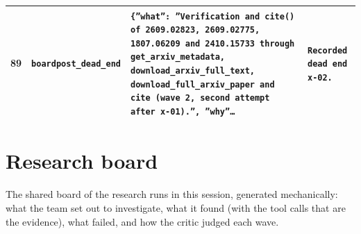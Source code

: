 \documentclass[11pt,a4paper]{article}
\begin{document}
\begin{longtable}{@{}p{}p{}p{}p{}@{}}
89 & \texttt{board}\newline\texttt{post\_\allowbreak{}dead\_\allowbreak{}end} & \texttt{\{''what'':\allowbreak{} ''Verification and cite()\allowbreak{} of 2609.02823,\allowbreak{} 2609.02775,\allowbreak{} 1807.06209 and 2410.15733 through get\_\allowbreak{}arxiv\_\allowbreak{}metadata,\allowbreak{} download\_\allowbreak{}arxiv\_\allowbreak{}full\_\allowbreak{}text,\allowbreak{} download\_\allowbreak{}full\_\allowbreak{}arxiv\_\allowbreak{}paper and cite (wave 2,\allowbreak{} second attempt after x-01)\allowbreak{}.'',\allowbreak{} ''why''\ldots{}\allowbreak{}} & \texttt{Recorded dead end x-02.} \\
\bottomrule\end{longtable}

\section{Research board}
\label{app:board}
The shared board of the research runs in this session, generated mechanically: what the team set out to investigate, what it found (with the tool calls that are the evidence), what failed, and how the critic judged each wave.
\end{document}
